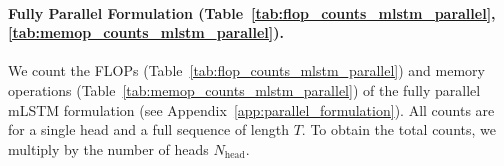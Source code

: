 \documentclass{article}
\begin{document}
\begin{table}[htbp]
\begin{tabular}{lcc}
            \bottomrule
        \end{tabular}
        \vspace{-0.2cm}
    \end{table}

    \paragraph{Fully Parallel Formulation (Table~\ref{tab:flop_counts_mlstm_parallel}, \ref{tab:memop_counts_mlstm_parallel}).}
    We count the FLOPs (Table~\ref{tab:flop_counts_mlstm_parallel}) and memory operations (Table~\ref{tab:memop_counts_mlstm_parallel}) of the fully parallel mLSTM formulation (see Appendix~\ref{app:parallel_formulation}).
    All counts are for a single head and a full sequence of length $T$.
    To obtain the total counts, we multiply by the number of heads $N_\text{head}$.
\end{document}
